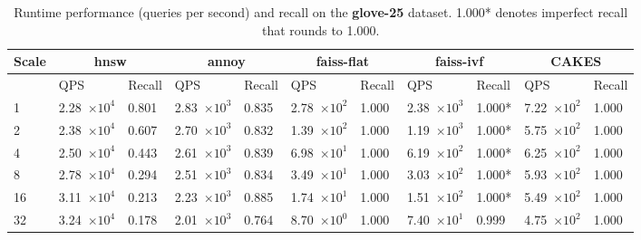 \begin{table}[!t]
    \caption{Runtime performance (queries per second) and recall on the \textbf{glove-25} dataset. 1.000* denotes imperfect recall that rounds to 1.000.}
    \label{table:results:ann-glove-25}
    \vskip 0.15in
    \begin{center}
        \begin{small}
            \begin{sc}
                \begin{tabular}{|l|p{1.2cm}|p{0.8cm}|p{1.2cm}|p{0.8cm}|p{1.2cm}|p{0.8cm}|p{1.2cm}|p{0.8cm}|p{1.2cm}|p{0.8cm}|}
                    \hline
                    \textbf{Scale}  & \multicolumn{2}{|c|}{\textbf{hnsw}} & \multicolumn{2}{|c|}{\textbf{annoy}} & \multicolumn{2}{|c|}{\textbf{faiss-flat}} & \multicolumn{2}{|c|}{\textbf{faiss-ivf}}  & \multicolumn{2}{|c|}{\textbf{CAKES}} \\
                    \hline
                    &             QPS & Recall        & QPS & Recall      & QPS & Recall       & QPS & Recall     & QPS & Recall    \\
                    \hline
                    1   & 2.28~$\times10^{4}$ & 0.801 & 2.83~$\times10^{3}$ & 0.835 & 2.78~$\times10^{2}$ & 1.000 & 2.38~$\times10^{3}$ & 1.000* & 7.22~$\times10^{2}$ & 1.000 \\
                    \hline
                    2   & 2.38~$\times10^{4}$ & 0.607 & 2.70~$\times10^{3}$ & 0.832 & 1.39~$\times10^{2}$ & 1.000 & 1.19~$\times10^{3}$ & 1.000* & 5.75~$\times10^{2}$ & 1.000 \\
                    \hline
                    4   & 2.50~$\times10^{4}$ & 0.443 & 2.61~$\times10^{3}$ & 0.839 & 6.98~$\times10^{1}$ & 1.000 & 6.19~$\times10^{2}$ & 1.000* & 6.25~$\times10^{2}$ & 1.000 \\
                    \hline
                    8   & 2.78~$\times10^{4}$ & 0.294 & 2.51~$\times10^{3}$ & 0.834 & 3.49~$\times10^{1}$ & 1.000 & 3.03~$\times10^{2}$ & 1.000* & 5.93~$\times10^{2}$ & 1.000 \\
                    \hline
                    16  & 3.11~$\times10^{4}$ & 0.213 & 2.23~$\times10^{3}$ & 0.885 & 1.74~$\times10^{1}$ & 1.000 & 1.51~$\times10^{2}$ & 1.000* & 5.49~$\times10^{2}$ & 1.000 \\
                    \hline
                    32  & 3.24~$\times10^{4}$ & 0.178 & 2.01~$\times10^{3}$ & 0.764 & 8.70~$\times10^{0}$ & 1.000 & 7.40~$\times10^{1}$ & 0.999  & 4.75~$\times10^{2}$ & 1.000 \\

\end{tabular}
\end{sc}
\end{small}
\end{center}
\end{table}
